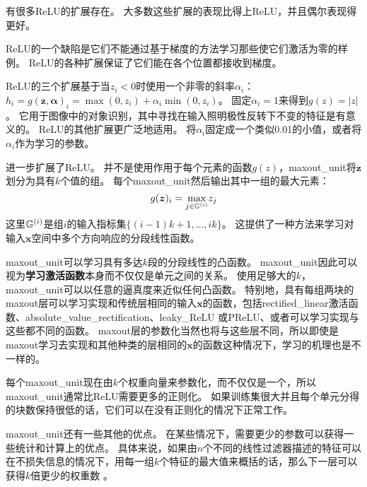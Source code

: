 有很多\gls{ReLU}的扩展存在。
大多数这些扩展的表现比得上\gls{ReLU}，并且偶尔表现得更好。

\gls{ReLU}的一个缺陷是它们不能通过基于梯度的方法学习那些使它们激活为零的样例。
\gls{ReLU}的各种扩展保证了它们能在各个位置都接收到梯度。

\gls{ReLU}的三个扩展基于当$z_i<0$时使用一个非零的斜率$\alpha_i$：$h_i =g(\bm{z}, \bm{\alpha})_i = \max(0, z_i) + \alpha_i \min(0, z_i)$。
固定$\alpha_i=1$来得到$g(z)=|z|$。
它用于图像中的对象识别\citep{Jarrett-ICCV2009}，其中寻找在输入照明极性反转下不变的特征是有意义的。
\gls{ReLU}的其他扩展更广泛地适用。
\citep{Maas-et-al-ICML2013}将$\alpha_i$固定成一个类似0.01的小值，或者\textbf{}将$\alpha_i$作为学习的参数\citep{He-et-al-arxiv2015}。


\citep{Goodfellow_maxout_2013}进一步扩展了\gls{ReLU}。
并不是使用作用于每个元素的函数$g(z)$，\gls{maxout_unit}将$\bm{z}$划分为具有$k$个值的组。
每个\gls{maxout_unit}然后输出其中一组的最大元素：
\begin{equation}
g(\bm{z})_i = \underset{j\in \mathbb{G}^{(i)}}{\max} z_j
\end{equation}
这里$\mathbb{G}^{(i)}$是组$i$的输入指标集$\{(i-1)k+1, \ldots, ik\}$。
这提供了一种方法来学习对输入$\bm{x}$空间中多个方向响应的分段线性函数。

\gls{maxout_unit}可以学习具有多达$k$段的分段线性的凸函数。
\gls{maxout_unit}因此可以视为\textbf{学习激活函数}本身而不仅仅是单元之间的关系。
使用足够大的$k$，\gls{maxout_unit}可以以任意的逼真度来近似任何凸函数。
特别地，具有每组两块的maxout层可以学习实现和传统层相同的输入$\bm{x}$的函数，包括\gls{rectified_linear}激活函数、\gls{absolute_value_rectification}、\gls{leaky_ReLU} 或\gls{PReLU}、或者可以学习实现与这些都不同的函数。
maxout层的参数化当然也将与这些层不同，所以即使是maxout学习去实现和其他种类的层相同的$\bm{x}$的函数这种情况下，学习的机理也是不一样的。

每个\gls{maxout_unit}现在由$k$个权重向量来参数化，而不仅仅是一个，所以\gls{maxout_unit}通常比\gls{ReLU}需要更多的正则化。
如果训练集很大并且每个单元分得的块数保持很低的话，它们可以在没有正则化的情况下正常工作\citep{cai2013deep}。

\gls{maxout_unit}还有一些其他的优点。
在某些情况下，需要更少的参数可以获得一些统计和计算上的优点。
具体来说，如果由$n$个不同的线性过滤器描述的特征可以在不损失信息的情况下，用每一组$k$个特征的最大值来概括的话，那么下一层可以获得$k$倍更少的权重数 。

